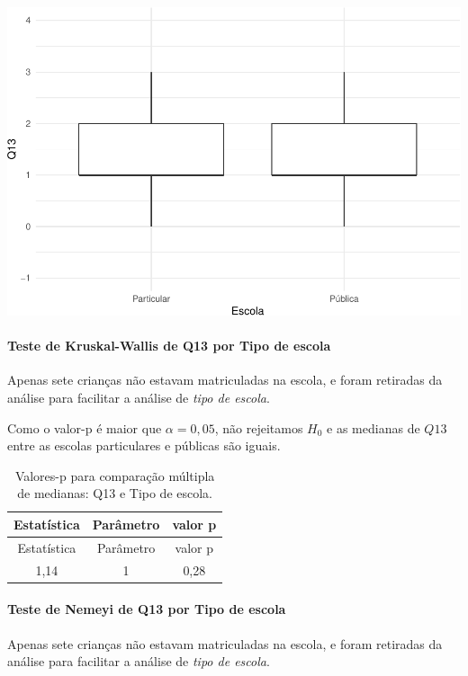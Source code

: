\documentclass[]{article}
\let\oldparagraph\paragraph
\renewcommand{\paragraph}[1]{\oldparagraph{#1}\mbox{}}
\begin{document}
\begin{center}\includegraphics[width=0.75\linewidth]{relatorio_files/figure-latex/unnamed-chunk-87-1} \end{center}

\hypertarget{teste-de-kruskal-wallis-de-q13-por-tipo-de-escola}{%
\paragraph{Teste de Kruskal-Wallis de Q13 por Tipo de escola}\label{teste-de-kruskal-wallis-de-q13-por-tipo-de-escola}}

Apenas sete crianças não estavam matriculadas na escola, e foram retiradas da análise para facilitar a análise de \emph{tipo de escola}.

Como o valor-p é maior que \(\alpha=0,05\), não rejeitamos \(H_0\) e as medianas de \(Q13\) entre as escolas particulares e públicas são iguais.

\begin{longtable}[]{@{}ccc@{}}
\caption{\label{tab:unnamed-chunk-88}Valores-p para comparação múltipla de medianas: Q13 e Tipo de escola.}\tabularnewline
\toprule
Estatística & Parâmetro & valor p\tabularnewline
\midrule
\endfirsthead
\toprule
Estatística & Parâmetro & valor p\tabularnewline
\midrule
\endhead
1,14 & 1 & 0,28\tabularnewline
\bottomrule
\end{longtable}

\hypertarget{teste-de-nemeyi-de-q13-por-tipo-de-escola}{%
\paragraph{Teste de Nemeyi de Q13 por Tipo de escola}\label{teste-de-nemeyi-de-q13-por-tipo-de-escola}}

Apenas sete crianças não estavam matriculadas na escola, e foram retiradas da análise para facilitar a análise de \emph{tipo de escola}.
\end{document}
